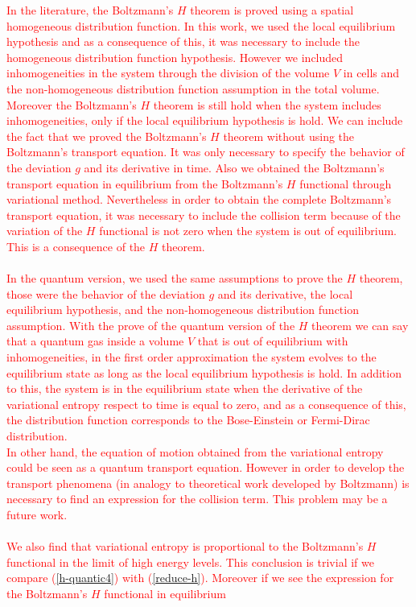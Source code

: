 \documentclass{article}
\begin{document}
\textcolor{red}{
In the literature, the Boltzmann's $H$ theorem is proved using a spatial homogeneous distribution function. In this work, we used the local equilibrium hypothesis and as a consequence of this, it was necessary to include the homogeneous distribution function hypothesis. However we included inhomogeneities in the system through the division of the volume $V$ in cells and the %
non-homogeneous distribution function assumption in the total volume. Moreover the Boltzmann's $H$ theorem is still hold when the system includes inhomogeneities, only if the local equilibrium hypothesis is hold. We can include the fact that we proved the Boltzmann's $H$ theorem without using the Boltzmann's transport equation. It was only necessary to specify the behavior of the deviation $g$ and its derivative in time. Also we obtained the Boltzmann's transport equation in equilibrium from the Boltzmann's $H$ functional through variational method. Nevertheless in order to obtain the complete Boltzmann's transport equation, it was necessary to include the collision term because of the variation of the $H$ functional is not zero when the system is out of equilibrium. This is a consequence of the $H$ theorem.\\
\\
In the quantum version, we used the same assumptions to prove the $H$ theorem, those were the behavior of the deviation $g$ and its derivative, the local equilibrium hypothesis, and the non-homogeneous distribution function assumption. With the prove of the quantum version of the $H$ theorem we can say that a quantum gas inside a volume $V$ that is out of equilibrium with inhomogeneities, in the first order approximation the system evolves to the equilibrium state as long as the local equilibrium hypothesis is hold. In addition to this, the system is in the equilibrium state when the derivative of the variational entropy respect to time is equal to zero, and as a consequence of this, the distribution function corresponds to the Bose-Einstein or Fermi-Dirac distribution.\\
In other hand, the equation of motion obtained from the variational entropy could be seen as a quantum transport equation. However in order to develop the transport phenomena (in analogy to theoretical work developed by Boltzmann) is necessary to find an expression for the collision term. This problem may be a future work.\\
\\
We also find that variational entropy is proportional to the Boltzmann's $H$ functional in the limit of high energy levels. This conclusion is trivial if we compare (\ref{h-quantic4}) with (\ref{reduce-h}). Moreover if we see the expression for the Boltzmann's $H$ functional in equilibrium
}
\end{document}
